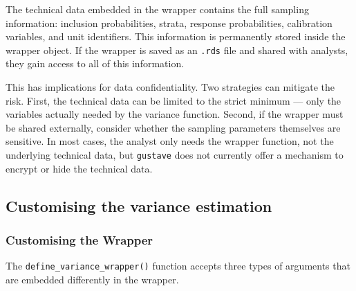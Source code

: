 \documentclass[
]{article}
\newenvironment{Shaded}{\begin{snugshade}}{\end{snugshade}}
\newcommand{\CommentTok}[1]{\textcolor[rgb]{0.56,0.35,0.01}{\textit{#1}}}
\newcommand{\FunctionTok}[1]{\textcolor[rgb]{0.13,0.29,0.53}{\textbf{#1}}}
\newcommand{\NormalTok}[1]{#1}
\newcommand{\OtherTok}[1]{\textcolor[rgb]{0.56,0.35,0.01}{#1}}
\newcommand{\SpecialCharTok}[1]{\textcolor[rgb]{0.81,0.36,0.00}{\textbf{#1}}}
\begin{document}
The technical data embedded in the wrapper contains the full sampling
information: inclusion probabilities, strata, response probabilities,
calibration variables, and unit identifiers. This information is
permanently stored inside the wrapper object. If the wrapper is saved as
an \texttt{.rds} file and shared with analysts, they gain access to all
of this information.

This has implications for data confidentiality. Two strategies can
mitigate the risk. First, the technical data can be limited to the
strict minimum --- only the variables actually needed by the variance
function. Second, if the wrapper must be shared externally, consider
whether the sampling parameters themselves are sensitive. In most cases,
the analyst only needs the wrapper function, not the underlying
technical data, but \texttt{gustave} does not currently offer a
mechanism to encrypt or hide the technical data.

\begin{Shaded}
\end{Shaded}

\subsection{Customising the variance
estimation}\label{customising-the-variance-estimation}

\subsubsection{Customising the Wrapper}\label{customising-the-wrapper}

The \texttt{define\_variance\_wrapper()} function accepts three types of
arguments that are embedded differently in the wrapper.
\end{document}

